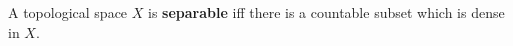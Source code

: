 A topological space $X$ is \textbf{separable} iff there is a countable subset which is dense in $X$.
